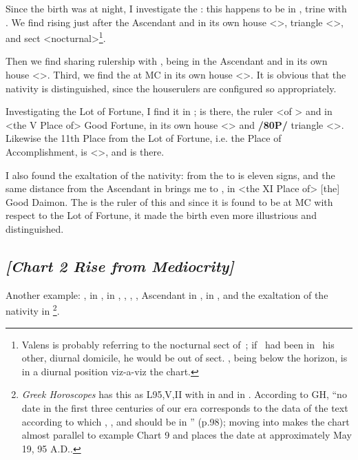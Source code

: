 Since the birth was at night, I investigate the \Moon: this
happens to be in \Cancer, trine with \Mars. We find \Mars\xspace rising just after the Ascendant and in its own
house <\Scorpio>, triangle <\Scorpio\xspace\Pisces\xspace \Cancer>, and sect <nocturnal>\footnote{Valens is probably referring to the nocturnal sect of \Scorpio\,; if \Mars\, had been in \Aries\, his other, diurnal domicile, he would be out of sect. \Mars, being below the horizon, is in a diurnal position viz-a-viz the chart.}. 

Then we find \Venus\xspace sharing rulership with \Mars, being in the Ascendant and in its own house <\Libra>. Third, we find the \Moon\xspace at MC in its own house <\Cancer>. It is obvious that the nativity is distinguished, since the houserulers are configured so appropriately. 

Investigating the Lot of Fortune, I find it in \Aquarius; \Saturn\xspace is there, the ruler <of \Aquarius> and in <the V Place of> Good Fortune, in its own house <\Aquarius> and \textbf{/80P/} triangle <\Aquarius\xspace \Libra\xspace \Gemini>. Likewise the 11th Place from the Lot of Fortune, i.e. the Place of Accomplishment, is <\Sagittarius>, and \Jupiter\xspace is there.

I also found the exaltation of the nativity: from the \Moon\xspace to \Taurus\xspace is eleven signs, and the same distance from the Ascendant in \Libra\xspace brings me to \Leo, in <the XI Place of> [the] Good Daimon. The \Sun\xspace is the ruler of this and since it is found to be at MC with respect to the Lot of Fortune, it made the birth even more illustrious and distinguished.
\newpage
\subsection*{\textit{[Chart 2 Rise from Mediocrity]}}

Another example: \Sun, \Mercury\xspace in \Taurus, \Moon\xspace in \Aries, \Saturn, \Mars, \Venus, Ascendant in \Cancer,
\Jupiter\xspace in \Capricorn, \Fortune\xspace and the exaltation of the nativity in \Gemini
\footnote{\textit{Greek Horoscopes} has this as L95,V,II with \Saturn\xspace in \Leo\xspace and \Jupiter\xspace in \Virgo. According to GH, ``no date in the first three centuries of our era corresponds to the data of the text according to which \Saturn, \Mars, and \Venus\xspace should be in \Cancer'' (p.98); moving \Saturn\xspace into \Leo\xspace makes the chart almost parallel to example Chart 9 and places the date at approximately May 19, 95 A.D..}.

